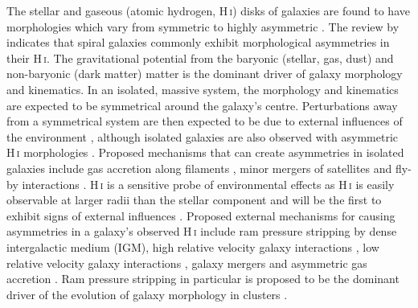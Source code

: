 \documentclass[fleqn,usenatbib]{mnras}
\begin{document}
The stellar and gaseous (atomic hydrogen, H\,\textsc{i}) disks of galaxies are found to have morphologies which vary from symmetric to highly asymmetric \citep[first studied in H\,\textsc{i} by][]{Baldwin1980}. The review by \cite{Jog2009} indicates that spiral galaxies commonly exhibit morphological asymmetries in their H\,\textsc{i}. The gravitational potential from the baryonic (stellar, gas, dust) and non-baryonic (dark matter) matter is the dominant driver of galaxy morphology and kinematics. In an isolated, massive system, the morphology and kinematics are expected to be symmetrical around the galaxy's centre. Perturbations away from a symmetrical system are then expected to be due to external influences of the environment \citep[e.g.][]{Hibbard2001}, although isolated galaxies are also observed with asymmetric H\,\textsc{i} morphologies \citep[e.g.][]{Portas2011,Athanassoula2010}. Proposed mechanisms that can create asymmetries in isolated galaxies include gas accretion along filaments \citep[e.g.][]{Bournaud2005b,Mapelli2008}, minor mergers of satellites \citep[e.g.][]{Zaritsky1997,Bournaud2005b,LagosP2018} and fly-by interactions \citep[e.g.][]{Mapelli2008}. H\,\textsc{i} is a sensitive probe of environmental effects as H\,\textsc{i} is easily observable at larger radii than the stellar component and will be the first to exhibit signs of external influences \citep[e.g.][]{Giovanelli1985,Solanes2001,Rasmussen2006,Rasmussen2012,Westmeier2011,Denes2014,Odekon2016}. Proposed external mechanisms for causing asymmetries in a galaxy's observed H\,\textsc{i} include ram pressure stripping \citep[e.g.][]{Gunn1972,Kenney2004} by dense intergalactic medium (IGM), high relative velocity galaxy interactions \citep[harassment,][]{Moore1996,Moore1998}, low relative velocity galaxy interactions \citep[tidal stripping,][]{Moore1999,Koribalski2009,English2010}, galaxy mergers \citep[e.g.][]{Zaritsky1997,Rubin1970} and asymmetric gas accretion \citep[e.g.][]{Bournaud2005b,Sancisi2008,LagosP2018}. Ram pressure stripping in particular is proposed to be the dominant driver of the evolution of galaxy morphology in clusters \citep[e.g.][]{Boselli2006}.
\end{document}

